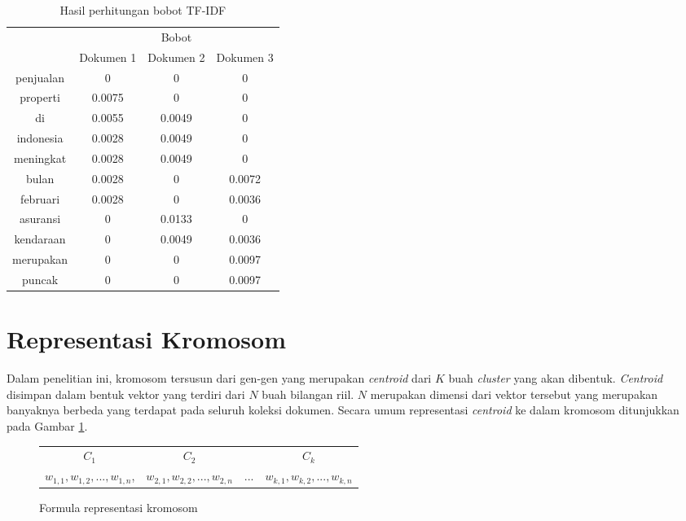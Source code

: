 \begin{table}[H]
	\centering
	\begin{tabular}{|c|c|c|c|} \hline
		\multirow{2}{*}{\Term} & \multicolumn{3}{c|}{Bobot} \\ \cline{2-4}
		& Dokumen 1 & Dokumen 2 & Dokumen 3 \\ \hline 
        penjualan & 0 & 0 & 0 \\ \hline
        properti & 0.0075 & 0 & 0 \\ \hline
        di & 0.0055 & 0.0049 & 0 \\ \hline
        indonesia & 0.0028 & 0.0049 & 0 \\ \hline
        meningkat & 0.0028 & 0.0049 & 0 \\ \hline
        bulan & 0.0028 & 0 & 0.0072 \\ \hline
        februari & 0.0028 & 0 & 0.0036 \\ \hline
        asuransi & 0 & 0.0133 & 0 \\ \hline
        kendaraan & 0 & 0.0049 & 0.0036 \\ \hline
        merupakan & 0 & 0 & 0.0097 \\ \hline
        puncak & 0 & 0 & 0.0097 \\ \hline
	\end{tabular}
	\caption{Hasil perhitungan bobot TF-IDF}
	\label{tbl:tf-idf}
\end{table}

\section{Representasi Kromosom}
\label{sec:chromosome-rep}
Dalam penelitian ini, kromosom tersusun dari gen-gen yang merupakan \textit{centroid} dari $K$ buah \textit{cluster} yang akan dibentuk. \textit{Centroid} disimpan dalam bentuk vektor yang terdiri dari $N$ buah bilangan riil. $N$ merupakan dimensi dari vektor tersebut yang merupakan banyaknya \term berbeda yang terdapat pada seluruh koleksi dokumen. Secara umum representasi \textit{centroid} ke dalam kromosom ditunjukkan pada Gambar \ref{fig:chromosome-rep}.

\begin{figure}[H]
	\centering
	\begin{tabular}{c c c c}
		$C_1$ & $C_2$ & & $C_k$ \\
		$w_{1,1}, w_{1,2}, ..., w_{1,n}$, & $w_{2,1}, w_{2,2}, ..., w_{2,n}$ & ... & $w_{k,1}, w_{k,2}, ..., w_{k,n}$
	\end{tabular}
	\caption{Formula representasi kromosom}
	\label{fig:chromosome-rep}
\end{figure}


